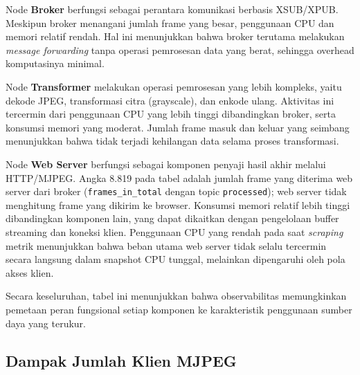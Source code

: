 Node \textbf{Broker} berfungsi sebagai perantara komunikasi berbasis XSUB/XPUB. Meskipun broker menangani jumlah frame yang besar, penggunaan CPU dan memori relatif rendah. Hal ini menunjukkan bahwa broker terutama melakukan \emph{message forwarding} tanpa operasi pemrosesan data yang berat, sehingga overhead komputasinya minimal.

Node \textbf{Transformer} melakukan operasi pemrosesan yang lebih kompleks, yaitu dekode JPEG, transformasi citra (grayscale), dan enkode ulang. Aktivitas ini tercermin dari penggunaan CPU yang lebih tinggi dibandingkan broker, serta konsumsi memori yang moderat. Jumlah frame masuk dan keluar yang seimbang menunjukkan bahwa tidak terjadi kehilangan data selama proses transformasi.

Node \textbf{Web Server} berfungsi sebagai komponen penyaji hasil akhir melalui HTTP/MJPEG. Angka 8.819 pada tabel adalah jumlah frame yang diterima web server dari broker (\texttt{frames\_in\_total} dengan topic \texttt{processed}); web server tidak menghitung frame yang dikirim ke browser. Konsumsi memori relatif lebih tinggi dibandingkan komponen lain, yang dapat dikaitkan dengan pengelolaan buffer streaming dan koneksi klien. Penggunaan CPU yang rendah pada saat \emph{scraping} metrik menunjukkan bahwa beban utama web server tidak selalu tercermin secara langsung dalam snapshot CPU tunggal, melainkan dipengaruhi oleh pola akses klien.

Secara keseluruhan, tabel ini menunjukkan bahwa observabilitas memungkinkan pemetaan peran fungsional setiap komponen ke karakteristik penggunaan sumber daya yang terukur.

\subsection*{Dampak Jumlah Klien MJPEG}


